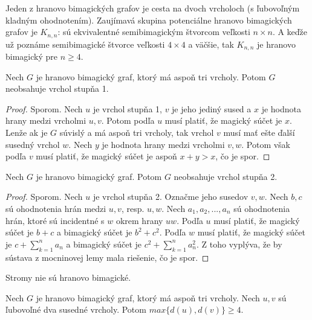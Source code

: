 Jeden z hranovo bimagických grafov je cesta na dvoch vrcholoch (s ľubovoľným kladným ohodnotením). Zaujímavá skupina potenciálne hranovo bimagických grafov je $K _{n,n}$: sú ekvivalentné semibimagickým štvorcom veľkosti $n \times n$. A keďže už poznáme semibimagické štvorce veľkosti $4 \times 4$ a väčšie, tak $K _{n,n}$ je hranovo bimagický pre $n \geq 4$.  \\

\begin{theorem}
\label{hbgdegree1}
Nech $G$ je hranovo bimagický graf, ktorý má aspoň tri vrcholy. Potom $G$ neobsahuje vrchol stupňa 1.
\end{theorem}

\begin{proof} Sporom. Nech $u$ je vrchol stupňa 1, $v$ je jeho jediný sused a $x$ je hodnota hrany medzi vrcholmi $u,v$. Potom podľa $u$ musí platiť, že magický súčet je $x$. Lenže ak je $G$ súvislý a má aspoň tri vrcholy, tak vrchol $v$ musí mať ešte ďalší susedný vrchol $w$. Nech $y$ je hodnota hrany medzi vrcholmi $v,w$. Potom však podľa $v$ musí platiť, že magický súčet je aspoň $x + y > x$, čo je spor.
\end{proof} 

\begin{theorem} Nech $G$ je hranovo bimagický graf. Potom $G$ neobsahuje vrchol stupňa 2.
\end{theorem}

\begin{proof} Sporom. Nech $u$ je vrchol stupňa 2. Označme jeho susedov $v,w$. Nech $b,c$ sú ohodnotenia hrán medzi $u,v$, resp. $u,w$. Nech $a_1, a_2, ... , a_n$ sú ohodnotenia hrán, ktoré sú incidentné s $w$ okrem hrany $uw$. Podľa $u$ musí platiť, že magický súčet je $b+c$ a bimagický súčet je $b^2 + c^2$. Podľa $w$ musí platiť, že magický súčet je $c + \sum_{k=1}^{n} a_n$ a bimagický súčet je $c^2 + \sum_{k=1}^{n} a^2_n$. Z toho vyplýva, že by sústava z mocninovej lemy mala riešenie, čo je spor.
\end{proof} 

\begin{consequence}
\label{hbgtree} 
Stromy nie sú hranovo bimagické.
\end{consequence}

\begin{theorem} Nech $G$ je hranovo bimagický graf, ktorý má aspoň tri vrcholy. Nech $u,v$ sú ľubovoľné dva susedné vrcholy. Potom $max \{d(u), d(v)\} \geq 4$.
\end{theorem}

